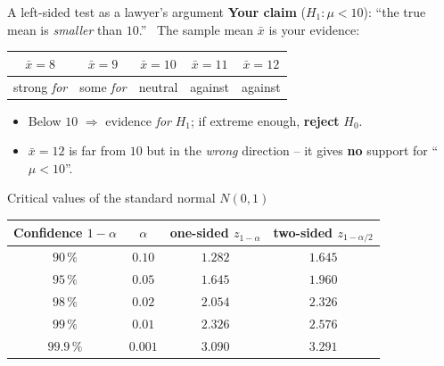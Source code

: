 \documentclass[aspectratio=169,11pt]{beamer}
\begin{document}
\begin{frame}{A left-sided test as a lawyer's argument}
  \textbf{Your claim} ($H_1:\mu<10$): ``the true mean is \emph{smaller} than
  $10$.'' \ The sample mean $\bar x$ is your evidence:
  \begin{center}
    \renewcommand{\arraystretch}{1.25}
    \begin{tabular}{ccccc}
      \toprule
      $\bar x=8$ & $\bar x=9$ & $\bar x=10$ & $\bar x=11$ & $\bar x=12$\\
      \midrule
      strong \emph{for} & some \emph{for} & neutral & against & against\\
      \bottomrule
    \end{tabular}
  \end{center}
  \begin{itemize}\setlength{\itemsep}{2pt}
    \item Below $10$ $\Rightarrow$ evidence \emph{for} $H_1$; if extreme enough,
          \textbf{reject} $H_0$.
    \item $\bar x=12$ is far from $10$ but in the \emph{wrong} direction -- it
          gives \textbf{no} support for ``$\mu<10$''.
  \end{itemize}
\end{frame}

\begin{frame}{Critical values of the standard normal $N(0,1)$}
  \begin{center}
    \renewcommand{\arraystretch}{1.35}
    \begin{tabular}{cccc}
      \toprule
      Confidence $1-\alpha$ & $\alpha$ & \textbf{one-sided} $z_{1-\alpha}$
        & \textbf{two-sided} $z_{1-\alpha/2}$\\
      \midrule
      $90\,\%$   & $0.10$  & $1.282$ & $1.645$\\
      $95\,\%$   & $0.05$  & $1.645$ & $1.960$\\
      $98\,\%$   & $0.02$  & $2.054$ & $2.326$\\
      $99\,\%$   & $0.01$  & $2.326$ & $2.576$\\
      $99.9\,\%$ & $0.001$ & $3.090$ & $3.291$\\
      \bottomrule
    \end{tabular}
  \end{center}
\end{frame}
\end{document}

